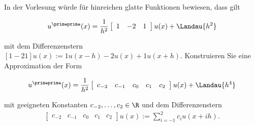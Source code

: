 \begin{exercise}
  In der Vorlesung würde für hinreichen glatte Funktionen bewiesen, dass gilt

  \begin{align*}
    u^\primeprime (x) = \frac{1}{h^2}\left[
    \begin{array}{ccc}
      1 & -2 & 1
    \end{array}
    \right] u(x) +
    \Landau{h^2}
  \end{align*}

  mit dem Differenzenstern $[1   -2   1]u(x):= 1u(x-h)-2u(x)+1u(x+h)$.
  Konstruieren Sie eine Approximation der Form

  \begin{align*}
    u^\primeprime (x) = \frac{1}{h^2} \left[
    \begin{array}{ccccc}
    c_{-2} & c_{-1} & c_0 & c_1 & c_ 2
    \end{array}
    \right]
    u(x) + \Landau{h^4}
  \end{align*}

  mit geeigneten Konstanten $c_{-2}, \dots , c_2 \in \R$ und dem Differenzenstern
  \begin{align*}
    \left[
    \begin{array}{ccccc}
        c_{-2} & c_{-1} & c_0 & c_1 & c_ 2
    \end{array}
    \right]
    u(x)
    :=
    \sum_{i=-1}^2 c_i u(x+ih).
  \end{align*}
\end{exercise}

